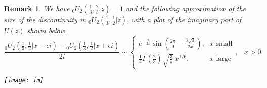\documentclass[12pt]{article}
\newcommand{\ee}[0] {e}
\newcommand{\ii}[0] {i}
\numberwithin{equation}{section}
\newtheorem{remark}[theorem]{Remark}
\newcommand{\FFf}[5] {{}_{#1}{#2}_{#3} \left(#4 | {#5} \right)}
\begin{document}
\begin{remark}
We have $\FFf{0}{U}{2}{\tfrac{1}{3},\tfrac{2}{3}}{z}=1$ and the following approximation of the size of the discontinuity in $\FFf{0}{U}{2}{\tfrac{1}{3},\tfrac{1}{2}}{z}$, with a plot of the imaginary part of $U(z)$ shown below.
\begin{equation*}
\frac{\FFf{0}{U}{2}{\tfrac{1}{3},\tfrac{1}{2}}{x-\epsilon \ii}-\FFf{0}{U}{2}{\tfrac{1}{3},\tfrac{1}{2}}{x+ \epsilon \ii}}{2\ii} \sim \begin{cases}
\ee^{-\frac{9}{2x}} \sin \left(\frac{2 \pi }{9}-\frac{3 \sqrt{3}}{2 x}\right)\text{,} & x \text{ small}\\
\frac{1}{4} \Gamma\left(\frac{2}{3}\right) \sqrt{\frac{3}{\pi }} \, x^{1/6}\text{,} & x \text{ large}
\end{cases}\text{,} \quad x > 0.
\end{equation*}
\begin{center}
\texttt{[image: im]}
\end{center}
\end{remark}
\end{document}

